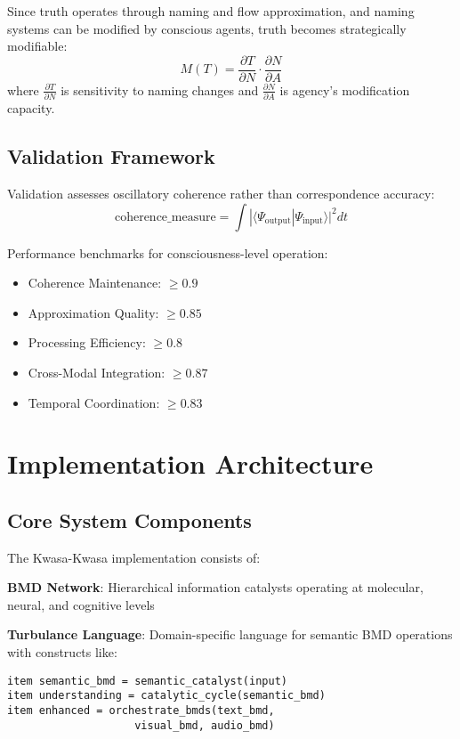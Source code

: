 \documentclass[11pt,twocolumn]{article}
\theoremstyle{remark}
\begin{document}
Since truth operates through naming and flow approximation, and naming systems can be modified by conscious agents, truth becomes strategically modifiable:
\begin{equation}
M(T) = \frac{\partial T}{\partial N} \cdot \frac{\partial N}{\partial A}
\end{equation}
where $\frac{\partial T}{\partial N}$ is sensitivity to naming changes and $\frac{\partial N}{\partial A}$ is agency's modification capacity.

\subsection{Validation Framework}

Validation assesses oscillatory coherence rather than correspondence accuracy:
\begin{equation}
\text{coherence\_measure} = \int |\langle\Psi_{\text{output}}|\Psi_{\text{input}}\rangle|^2 dt
\end{equation}

Performance benchmarks for consciousness-level operation:
\begin{itemize}
\item Coherence Maintenance: $\geq 0.9$
\item Approximation Quality: $\geq 0.85$
\item Processing Efficiency: $\geq 0.8$
\item Cross-Modal Integration: $\geq 0.87$
\item Temporal Coordination: $\geq 0.83$
\end{itemize}

\section{Implementation Architecture}

\subsection{Core System Components}

The Kwasa-Kwasa implementation consists of:

\textbf{BMD Network}: Hierarchical information catalysts operating at molecular, neural, and cognitive levels

\textbf{Turbulance Language}: Domain-specific language for semantic BMD operations with constructs like:
\begin{verbatim}
item semantic_bmd = semantic_catalyst(input)
item understanding = catalytic_cycle(semantic_bmd)
item enhanced = orchestrate_bmds(text_bmd,
                    visual_bmd, audio_bmd)
\end{verbatim}
\end{document}
